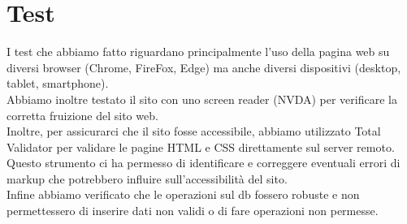 \section{Test}
I test che abbiamo fatto riguardano principalmente l'uso della pagina web su diversi browser (Chrome, FireFox, Edge) ma anche diversi dispositivi (desktop, tablet, smartphone).\\
Abbiamo inoltre testato il sito con uno screen reader (NVDA) per verificare la corretta fruizione del sito web.\\
Inoltre, per assicurarci che il sito fosse accessibile, abbiamo utilizzato Total Validator per validare le pagine HTML e CSS direttamente sul server remoto. Questo strumento ci ha permesso di identificare e correggere eventuali errori di markup che potrebbero influire sull'accessibilità del sito.\\
Infine abbiamo verificato che le operazioni sul db fossero robuste e non permettessero di inserire dati non validi o di fare operazioni non permesse.\\